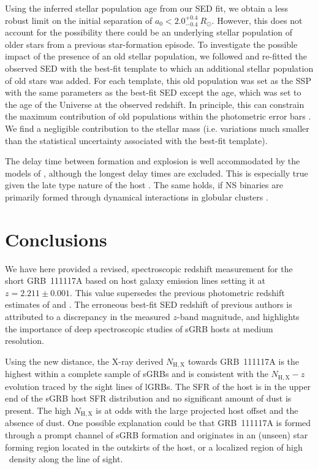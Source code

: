 \documentclass{aa}    %
\begin{document}
Using the inferred stellar population age from our SED fit, we obtain a less
robust limit on the initial separation of $a_0 < 2.0^{+0.4}_{-0.4}~R_\odot$.
However, this does not account for the possibility there could be an underlying
stellar population of older stars from a previous star-formation episode. To
investigate the possible impact of the presence of an old stellar population, we
followed \citet{Papovich2001} and re-fitted the observed SED with the best-fit
template to which an additional stellar population of old stars was added. For
each template, this old population was set as the SSP with the same parameters as
the best-fit SED except the age, which was set to the age of the Universe at
the observed redshift. In principle, this can constrain the maximum contribution
of old populations within the photometric error bars \citep[see][for
details]{Papovich2001}. We find a negligible contribution to the stellar mass
(i.e. variations much smaller than the statistical uncertainty associated with
the best-fit template).

The delay time between formation and explosion is well accommodated by the
models of \citet{Belczynski2006}, although the longest delay times are excluded.
This is especially true given the late type nature of the host
\citep{OShaughnessy2008}. The same holds, if NS binaries are primarily formed
through dynamical interactions in globular clusters \citep{Lee2010, Church2011}.

\section{Conclusions}

We have here provided a revised, spectroscopic redshift measurement for the
short GRB~111117A based on host galaxy emission lines setting it at $z = 2.211
\pm 0.001$. This value supersedes the previous photometric redshift estimates of
\citet{Margutti2012} and \citet{Sakamoto2013}. The erroneous best-fit SED
redshift of previous authors is attributed to a discrepancy in the measured
$z$-band magnitude, and highlights the importance of deep spectroscopic studies
of sGRB hosts at medium resolution.

Using the new distance, the X-ray derived $N_\mathrm{H,X}$ towards GRB~111117A
is the highest within a complete sample of sGRBs and is consistent with the
$N_\mathrm{H,X}-z$ evolution traced by the sight lines of lGRBs. The SFR of the
host is in the upper end of the sGRB host SFR distribution and no significant
amount of dust is present. The high $N_\mathrm{H,X}$ is at odds with the large
projected host offset and the absence of dust. One possible explanation could be
that GRB~111117A is formed through a prompt channel of sGRB formation and
originates in an (unseen) star forming region located in the outskirts of the
host, or a localized region of high \hi~density along the line of sight.
\end{document}
